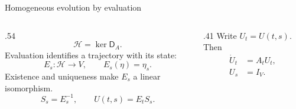 \begin{frame}[t]{Homogeneous evolution by evaluation}
\hypertarget{main:homogeneous}{}
\begin{columns}[T,onlytextwidth]
  \begin{column}{.54\textwidth}
    \begin{equation*}
      \mathcal H=\ker\mathsf D_A.
    \end{equation*}
    Evaluation identifies a trajectory with its state:
    \begin{equation*}
      E_s:\mathcal H\to V,\qquad E_s(\eta)=\eta_s.
    \end{equation*}
    Existence and uniqueness make $E_s$ a linear isomorphism.
    \begin{equation*}
      S_s=E_s^{-1},\qquad U(t,s)=E_tS_s.
    \end{equation*}
  \end{column}
  \begin{column}{.41\textwidth}
    \medskip
    Write $U_t=U(t,s)$. Then
    \begin{equation*}
      \begin{aligned}
        \dot U_t&=A_tU_t,\\
        U_s&=I_V.
      \end{aligned}
    \end{equation*}
  \end{column}
\end{columns}
\end{frame}

